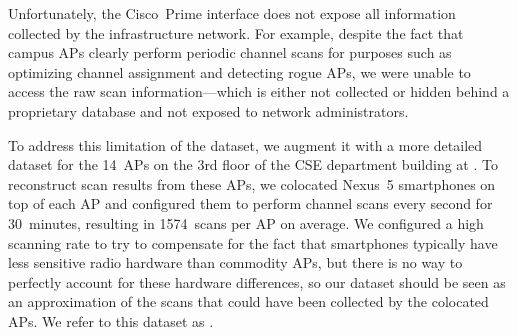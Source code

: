 Unfortunately, the Cisco~Prime interface does not expose all information
collected by the infrastructure network. For example, despite the fact that
\ub{} campus APs clearly perform periodic channel scans for purposes such as
optimizing channel assignment and detecting rogue APs, we were unable to
access the raw scan information---which is either not collected or hidden
behind a proprietary database and not exposed to network administrators.

To address this limitation of the \ubap{} dataset, we augment it with a more
detailed dataset for the 14~APs on the 3rd floor of the CSE department building
at \ub{}. To
reconstruct scan results from these APs, we colocated Nexus~5 smartphones on top
of each AP and configured them to perform channel scans every second for
30~minutes, resulting in \num{1574}~scans per AP on average. We configured a
high scanning rate to try to compensate for the fact that smartphones typically
have less sensitive radio hardware than commodity APs, but there is no way to
perfectly account for these hardware differences, so our dataset should be seen
as an approximation of the scans that could have been collected by the colocated
APs. We refer to this dataset as \textbf{\ubapdetail{}}.
